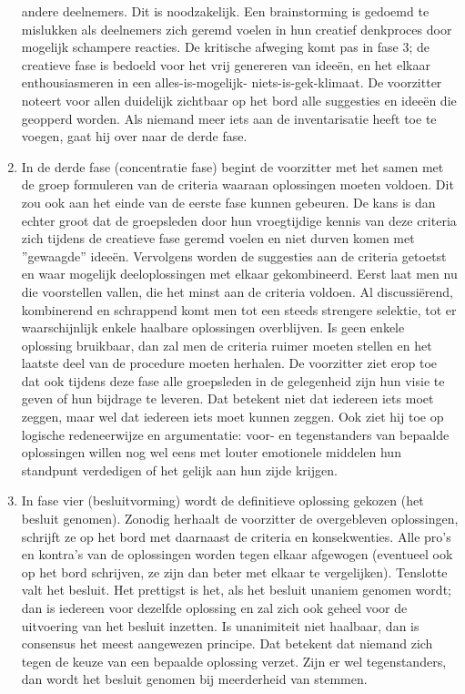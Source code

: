 \begin{enumerate}
     andere deelnemers. Dit is noodzakelijk. Een brainstorming
     is gedoemd te mislukken als deelnemers zich geremd voelen
     in hun creatief denkproces door mogelijk schampere reacties. De kritische afweging komt pas in fase 3; de creatieve fase is bedoeld voor het vrij genereren van idee\"en,
     en het elkaar enthousiasmeren in een alles-is-mogelijk-
     niets-is-gek-klimaat.
     De voorzitter noteert voor allen duidelijk zichtbaar op
     het bord alle suggesties en idee\"en die geopperd worden.
     Als niemand meer iets aan de inventarisatie heeft toe te
     voegen, gaat hij over naar de derde fase.
\item    In de derde fase (concentratie fase) begint de voorzitter
     met het samen met de groep formuleren van de criteria
     waaraan oplossingen moeten voldoen.
     Dit zou ook aan het einde van de eerste fase kunnen gebeuren. De kans is dan echter groot dat de groepsleden
     door hun vroegtijdige kennis van deze criteria zich tijdens de creatieve fase geremd voelen en niet durven komen
     met ''gewaagde'' idee\"en.
     Vervolgens worden de suggesties aan de criteria getoetst
     en waar mogelijk deeloplossingen met elkaar gekombineerd.
     Eerst laat men nu die voorstellen vallen, die het minst
     aan de criteria voldoen. Al discussi\"erend, kombinerend en
     schrappend komt men tot een steeds strengere selektie,
     tot er waarschijnlijk enkele haalbare oplossingen overblijven.
     Is geen enkele oplossing bruikbaar, dan zal men de criteria ruimer moeten stellen en het laatste deel van de
     procedure moeten herhalen.
     De voorzitter ziet erop toe dat ook tijdens deze fase
     alle groeps\-leden in de gelegenheid zijn hun visie te
     geven of hun bijdrage te leveren. Dat betekent niet dat
     iedereen iets moet zeggen, maar wel dat iedereen iets
     moet kunnen zeggen.
     Ook ziet hij toe op logische redeneerwijze en argumentatie: voor- en tegenstanders van bepaalde oplossingen
     willen nog wel eens met louter emotionele middelen hun
     standpunt verdedigen of het gelijk aan hun zijde krijgen.
\item    In fase vier (besluitvorming) wordt de definitieve
     oplossing gekozen (het besluit genomen).
     Zonodig herhaalt de voorzitter de overgebleven oplossingen, schrijft ze op het bord met daarnaast de criteria en
     konsekwenties. Alle pro's en kontra's van de oplossingen
     worden tegen elkaar afgewogen (eventueel ook op het bord
     schrijven, ze zijn dan beter met elkaar te ver\-ge\-lij\-ken).
     Tenslotte valt het besluit.
     Het prettigst is het, als het besluit unaniem genomen
     wordt; dan is iedereen voor dezelfde oplossing en zal
     zich ook geheel voor de uitvoering van het besluit inzetten. Is unanimiteit niet haalbaar, dan is consensus het
     meest aangewezen principe. Dat betekent dat niemand zich
     tegen de keuze van een bepaalde oplossing verzet.
     Zijn er wel tegenstanders, dan wordt het besluit genomen
     bij meerderheid van stemmen.


\end{enumerate}
